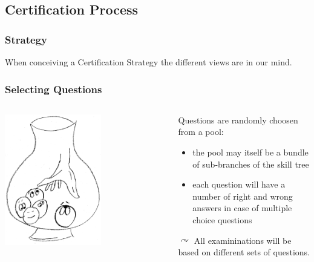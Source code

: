 \subsection{Certification Process}

\begin{frame}
  \frametitle{Strategy}
  When conceiving a Certification Strategy the different views are in our mind.
  
\end{frame}

\begin{frame}
 \frametitle{Selecting Questions}
 \begin{columns}
    \begin{column}{.5\textwidth}
       \centering
      \includegraphics[width=0.6\textwidth]{images/urn}
    \end{column}
    \begin{column}{.5\textwidth}
      Questions are randomly choosen from a pool:
      \begin{itemize}
        \item the pool may itself be a bundle of sub-branches of the skill tree
        \item each question will have a number of right and wrong answers in case of multiple choice questions
      \end{itemize}
      $\curvearrowright$ All examininations will be based on different sets of questions.
    \end{column}
  \end{columns}
\end{frame}

